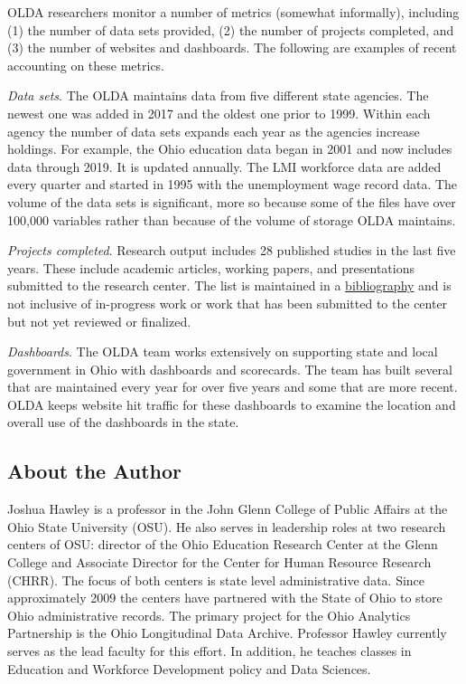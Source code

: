 \documentclass[
]{WileySix}
\begin{document}
OLDA researchers monitor a number of metrics (somewhat informally), including (1) the number of data sets provided, (2) the number of projects completed, and (3) the number of websites and dashboards. The following are examples of recent accounting on these metrics.

\emph{Data sets}. The OLDA maintains data from five different state agencies. The newest one was added in 2017 and the oldest one prior to 1999. Within each agency the number of data sets expands each year as the agencies increase holdings. For example, the Ohio education data began in 2001 and now includes data through 2019. It is updated annually. The LMI workforce data are added every quarter and started in 1995 with the unemployment wage record data. The volume of the data sets is significant, more so because some of the files have over 100,000 variables rather than because of the volume of storage OLDA maintains.

\emph{Projects completed}. Research output includes 28 published studies in the last five years. These include academic articles, working papers, and presentations submitted to the research center. The list is maintained in a \href{https://www.chrr.ohio-state.edu/content/olda_bib/olda_bib.html}{bibliography} and is not inclusive of in-progress work or work that has been submitted to the center but not yet reviewed or finalized.

\emph{Dashboards}. The OLDA team works extensively on supporting state and local government in Ohio with dashboards and scorecards. The team has built several that are maintained every year for over five years and some that are more recent. OLDA keeps website hit traffic for these dashboards to examine the location and overall use of the dashboards in the state.

\hypertarget{about-the-author-2}{%
\subsection*{About the Author}\label{about-the-author-2}}

Joshua Hawley is a professor in the John Glenn College of Public Affairs at the Ohio State University (OSU). He also serves in leadership roles at two research centers of OSU: director of the Ohio Education Research Center at the Glenn College and Associate Director for the Center for Human Resource Research (CHRR). The focus of both centers is state level administrative data. Since approximately 2009 the centers have partnered with the State of Ohio to store Ohio administrative records. The primary project for the Ohio Analytics Partnership is the Ohio Longitudinal Data Archive. Professor Hawley currently serves as the lead faculty for this effort. In addition, he teaches classes in Education and Workforce Development policy and Data Sciences.
\end{document}
